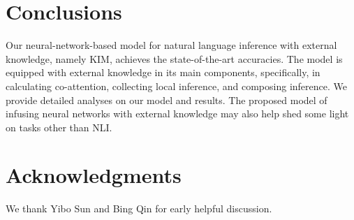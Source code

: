 \documentclass[11pt,a4paper]{article}
\begin{document}
\begin{table}[t!]
\renewcommand{\arraystretch}{0.9}
\centering
{}
\caption{Examples. Word in bold are key words in making final prediction. \textbf{P} indicates a predicted label and \textbf{G} indicates gold-standard label. \textit{e} and \textit{c} denote \textit{entailment} and \textit{contradiction}, respectively.}
\label{tab:examples}
\end{table}

\section{Conclusions}
Our neural-network-based model for natural language inference with external knowledge, namely KIM, achieves the state-of-the-art accuracies. The model is equipped with external knowledge in its main components, specifically, in calculating co-attention, collecting local inference, and composing inference. We provide detailed analyses on our model and results. The proposed model of infusing neural networks with external knowledge may also help shed some light on tasks other than NLI.

\section*{Acknowledgments}
We thank Yibo Sun and Bing Qin for early helpful discussion.

%
%
\newpage


\end{document}
